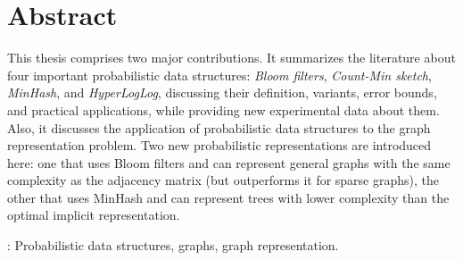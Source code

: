 \documentclass[titlepage,a4paper,oneside,onecolumn,12pt]{report}
\begin{document}

\chapter*{Abstract}

This thesis comprises two major contributions. It summarizes the literature about four important probabilistic data structures: \emph{Bloom filters}, \emph{Count-Min sketch}, \emph{MinHash}, and \emph{HyperLogLog}, discussing their definition, variants, error bounds, and practical applications, while providing new experimental data about them. Also, it discusses the application of probabilistic data structures to the graph representation problem. Two new probabilistic representations are introduced here: one that uses Bloom filters and can represent general graphs with the same complexity as the adjacency matrix (but outperforms it for sparse graphs), the other that uses MinHash and can represent trees with lower complexity than the optimal implicit representation.

\vspace{1em}
: Probabilistic data structures, graphs, graph representation.

\tableofcontents

\listadefiguras
\listofalgorithms

\onehalfspacing







\cleardoublepage


\singlespacing


\end{document}
